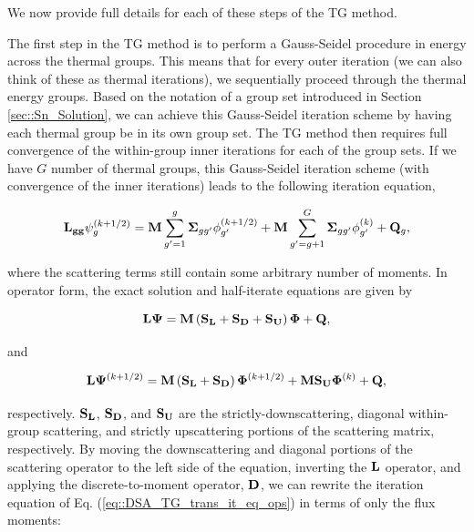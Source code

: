 \noindent We now provide full details for each of these steps of the TG method.

The first step in the TG method is to perform a Gauss-Seidel procedure in energy across the thermal groups. This means that for every outer iteration (we can also think of these as thermal iterations), we sequentially proceed through the thermal energy groups. Based on the notation of a group set introduced in Section \ref{sec::Sn_Solution}, we can achieve this Gauss-Seidel iteration scheme by having each thermal group be in its own group set. The TG method then requires full convergence of the within-group inner iterations for each of the group sets. If we have $G$ number of thermal groups, this Gauss-Seidel iteration scheme (with convergence of the inner iterations) leads to the following iteration equation,

\begin{equation}
\label{eq::DSA_TG_trans_it_eq}
{\bf L_{gg}} \psi_g^{(k+1/2)} = {\bf M} \sum_{g'=1}^g {\bf \Sigma}_{g g'} \phi_{g'}^{(k+1/2)} + {\bf M} \sum_{g'=g+1}^G {\bf \Sigma}_{g g'} \phi_{g'}^{(k)} + {\bf Q}_g ,
\end{equation}

\noindent where the scattering terms still contain some arbitrary number of moments. In operator form, the exact solution and half-iterate equations are given by

\begin{equation}
\label{eq::DSA_TG_trans_eq_ops}
{\bf L} {\bf \Psi} = {\bf M} \left( {\bf S_L} +  {\bf S_D} + {\bf S_U} \right) {\bf \Phi} + {\bf Q} ,
\end{equation}

\noindent and

\begin{equation}
\label{eq::DSA_TG_trans_it_eq_ops}
{\bf L} {\bf \Psi}^{(k+1/2)} = {\bf M} \left(  {\bf S_L} + {\bf S_D} \right) {\bf \Phi}^{(k+1/2)} + {\bf M} {\bf S_U} {\bf \Phi}^{(k)} + {\bf Q} ,
\end{equation}

\noindent respectively. ${\bf S_L}$, ${\bf S_D}$, and ${\bf S_U}$ are the strictly-downscattering, diagonal within-group scattering, and strictly upscattering portions of the scattering matrix, respectively. By moving the downscattering and diagonal portions of the scattering operator to the left side of the equation, inverting the ${\bf L}$ operator, and applying the discrete-to-moment operator, ${\bf D}$, we can rewrite the iteration equation of Eq. (\ref{eq::DSA_TG_trans_it_eq_ops}) in terms of only the flux moments:

